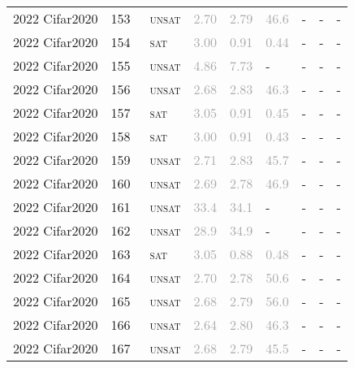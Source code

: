 \begin{center}
{\begin{longtable}{@{}lllllllll@{}}
2022 Cifar2020 & 153 & ~\textsc{unsat} & \textcolor{darkgray}{2.70} & \textcolor{darkgray}{2.79} & \textcolor{darkgray}{46.6} & - & - & - \\
2022 Cifar2020 & 154 & ~\textsc{sat} & \textcolor{darkgray}{3.00} & \textcolor{darkgray}{0.91} & \textcolor{darkgray}{0.44} & - & - & - \\
2022 Cifar2020 & 155 & ~\textsc{unsat} & \textcolor{darkgray}{4.86} & \textcolor{darkgray}{7.73} & - & - & - & - \\
2022 Cifar2020 & 156 & ~\textsc{unsat} & \textcolor{darkgray}{2.68} & \textcolor{darkgray}{2.83} & \textcolor{darkgray}{46.3} & - & - & - \\
2022 Cifar2020 & 157 & ~\textsc{sat} & \textcolor{darkgray}{3.05} & \textcolor{darkgray}{0.91} & \textcolor{darkgray}{0.45} & - & - & - \\
2022 Cifar2020 & 158 & ~\textsc{sat} & \textcolor{darkgray}{3.00} & \textcolor{darkgray}{0.91} & \textcolor{darkgray}{0.43} & - & - & - \\
2022 Cifar2020 & 159 & ~\textsc{unsat} & \textcolor{darkgray}{2.71} & \textcolor{darkgray}{2.83} & \textcolor{darkgray}{45.7} & - & - & - \\
2022 Cifar2020 & 160 & ~\textsc{unsat} & \textcolor{darkgray}{2.69} & \textcolor{darkgray}{2.78} & \textcolor{darkgray}{46.9} & - & - & - \\
2022 Cifar2020 & 161 & ~\textsc{unsat} & \textcolor{darkgray}{33.4} & \textcolor{darkgray}{34.1} & - & - & - & - \\
2022 Cifar2020 & 162 & ~\textsc{unsat} & \textcolor{darkgray}{28.9} & \textcolor{darkgray}{34.9} & - & - & - & - \\
2022 Cifar2020 & 163 & ~\textsc{sat} & \textcolor{darkgray}{3.05} & \textcolor{darkgray}{0.88} & \textcolor{darkgray}{0.48} & - & - & - \\
2022 Cifar2020 & 164 & ~\textsc{unsat} & \textcolor{darkgray}{2.70} & \textcolor{darkgray}{2.78} & \textcolor{darkgray}{50.6} & - & - & - \\
2022 Cifar2020 & 165 & ~\textsc{unsat} & \textcolor{darkgray}{2.68} & \textcolor{darkgray}{2.79} & \textcolor{darkgray}{56.0} & - & - & - \\
2022 Cifar2020 & 166 & ~\textsc{unsat} & \textcolor{darkgray}{2.64} & \textcolor{darkgray}{2.80} & \textcolor{darkgray}{46.3} & - & - & - \\
2022 Cifar2020 & 167 & ~\textsc{unsat} & \textcolor{darkgray}{2.68} & \textcolor{darkgray}{2.79} & \textcolor{darkgray}{45.5} & - & - & - \\

\end{longtable}}
\end{center}
